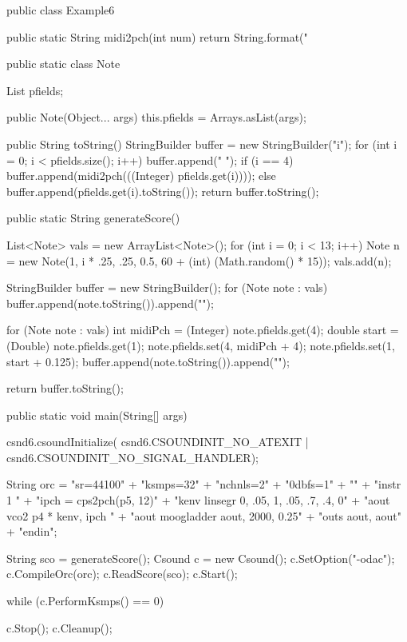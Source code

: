 public class Example6 {

    public static String midi2pch(int num) {
        return String.format("%
    }

    public static class Note {

        List pfields;

        public Note(Object... args) {
            this.pfields = Arrays.asList(args);
        }

        public String toString() {
            StringBuilder buffer = new StringBuilder("i");
            for (int i = 0; i < pfields.size(); i++) {
                buffer.append(" ");
                if (i == 4) {
                    buffer.append(midi2pch(((Integer) pfields.get(i))));
                } else {
                    buffer.append(pfields.get(i).toString());
                }
            }
            return buffer.toString();
        }
    }

    public static String generateScore() {
        List<Note> vals = new ArrayList<Note>();
        for (int i = 0; i < 13; i++) {
            Note n = new Note(1, i * .25, .25, 0.5,
                    60 + (int) (Math.random() * 15));
            vals.add(n);
        }

        StringBuilder buffer = new StringBuilder();
        for (Note note : vals) {
            buffer.append(note.toString()).append("\n");
        }

        for (Note note : vals) {
            int midiPch = (Integer) note.pfields.get(4);
            double start = (Double) note.pfields.get(1);
            note.pfields.set(4, midiPch + 4);
            note.pfields.set(1, start + 0.125);
            buffer.append(note.toString()).append("\n");
        }

        return buffer.toString();
    }

    public static void main(String[] args) {
        csnd6.csoundInitialize(
                csnd6.CSOUNDINIT_NO_ATEXIT | csnd6.CSOUNDINIT_NO_SIGNAL_HANDLER);

        String orc = "sr=44100\n"
                + "ksmps=32\n"
                + "nchnls=2\n"
                + "0dbfs=1\n"
                + "\n"
                + "instr 1 \n"
                + "ipch = cps2pch(p5, 12)\n"
                + "kenv linsegr 0, .05, 1, .05, .7, .4, 0\n"
                + "aout vco2 p4 * kenv, ipch \n"
                + "aout moogladder aout, 2000, 0.25\n"
                + "outs aout, aout\n"
                + "endin\n";
        
        String sco = generateScore();
        Csound c = new Csound();
        c.SetOption("-odac");
        c.CompileOrc(orc);
        c.ReadScore(sco);
        c.Start();

        while (c.PerformKsmps() == 0) {
        }
        
        c.Stop();
        c.Cleanup();

    }
}